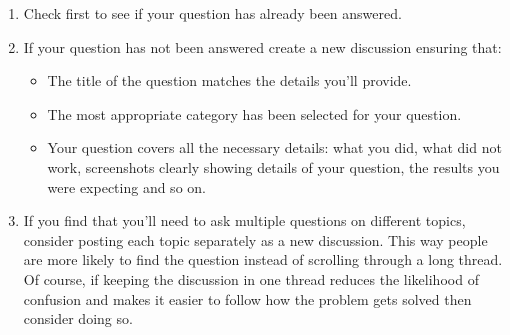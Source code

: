 \documentclass[12pt]{article}
\begin{document}
\begin{enumerate}
    \item Check first to see if your question has already been answered.
    \item If your question has not been answered create a new discussion ensuring that: 
    \begin{itemize}
        \item The title of the question matches the details you'll provide.
        \item The most appropriate category has been selected for your question.
        \item Your question covers all the necessary details: what you did, what did not work, screenshots clearly showing details of your question, the results you were expecting and so on.
    \end{itemize}
\item If you find that you'll need to ask multiple questions on different topics, consider posting each topic separately as a new discussion. This way people are more likely to find the question instead of scrolling through a long thread. Of course, if keeping the discussion in one thread reduces the likelihood of confusion and makes it easier to follow how the problem gets solved then consider doing so.
\end{enumerate}
 \printbibliography
\end{document}
